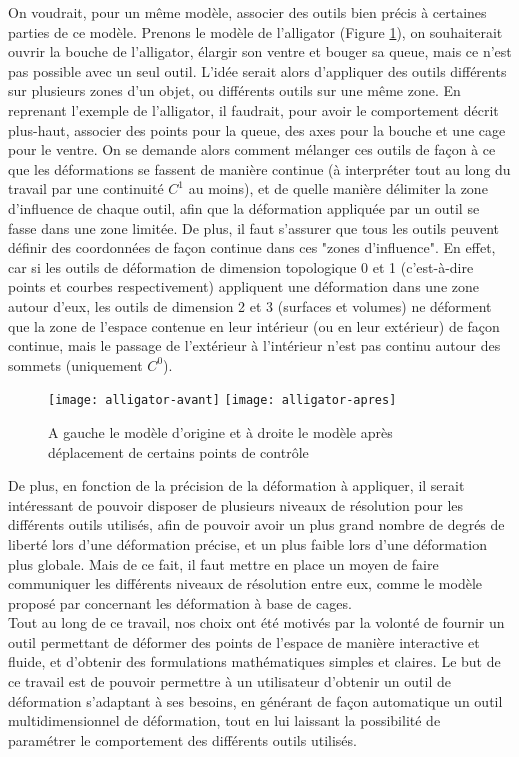 On voudrait, pour un même modèle, associer des outils bien précis à
certaines parties de ce modèle. Prenons le modèle de l'alligator
(Figure \ref{INTall}), on souhaiterait ouvrir la bouche de
l'alligator, élargir son ventre et bouger sa queue, mais ce n'est pas
possible avec un seul outil. L'idée serait alors d'appliquer des
outils différents sur plusieurs zones d'un objet, ou différents outils
sur une même zone. En reprenant l'exemple de l'alligator, il faudrait,
pour avoir le comportement décrit plus-haut, associer des points pour
la queue, des axes pour la bouche et une cage pour le ventre. On se
demande alors comment mélanger ces outils de façon à ce que les
déformations se fassent de manière continue (à interpréter tout au
long du travail par une continuité $C^1$ au moins), et de quelle
manière délimiter la zone d'influence de chaque outil, afin que la
déformation appliquée par un outil se fasse dans une zone limitée. De
plus, il faut s'assurer que tous les outils peuvent définir des
coordonnées de façon continue dans ces "zones d'influence". En effet,
car si les outils de déformation de dimension topologique 0 et 1
(c'est-à-dire points et courbes respectivement) appliquent une
déformation dans une zone autour d'eux, les outils de dimension 2 et 3
(surfaces et volumes) ne déforment que la zone de l'espace contenue en
leur intérieur (ou en leur extérieur) de façon continue, mais le
passage de l'extérieur à l'intérieur n'est pas continu autour des
sommets (uniquement $C^0$).
\\


\begin{figure}[h]
  \texttt{[image: alligator-avant]}
  \texttt{[image: alligator-apres]}
  \caption{A gauche le modèle d'origine et à droite le modèle après
    déplacement de certains points de contrôle}
  \label{INTall}
\end{figure}

De plus, en fonction de la précision de la déformation à appliquer, il
serait intéressant de pouvoir disposer de plusieurs niveaux de
résolution pour les différents outils utilisés, afin de pouvoir avoir
un plus grand nombre de degrés de liberté lors d'une déformation
précise, et un plus faible lors d'une déformation plus globale. Mais
de ce fait, il faut mettre en place un moyen de faire communiquer les
différents niveaux de résolution entre eux, comme le modèle proposé
par \cite{Hur12} concernant les déformation à base de cages.
\\

Tout au long de ce travail, nos choix ont été motivés par la volonté
de fournir un outil permettant de déformer des points de l'espace de
manière interactive et fluide, et d'obtenir des formulations
mathématiques simples et claires. Le but de ce travail est de pouvoir
permettre à un utilisateur d'obtenir un outil de déformation
s'adaptant à ses besoins, en générant de façon automatique un outil
multidimensionnel de déformation, tout en lui laissant la possibilité
de paramétrer le comportement des différents outils utilisés.


